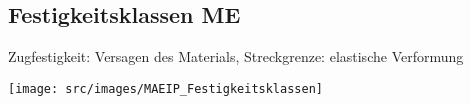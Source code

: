 \subsection{Festigkeitsklassen \hfill ME}
\begin{footnotesize}
    Zugfestigkeit: Versagen des Materials, Streckgrenze: elastische Verformung
    \begin{center}
        \texttt{[image: src/images/MAEIP\_Festigkeitsklassen]}
    \end{center}
\end{footnotesize}
\cbreak